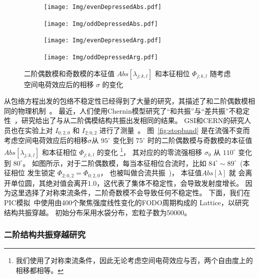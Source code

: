 \begin{figure}
    \centering
    \begin{subfigure}[b]{0.48\textwidth}
        \texttt{[image: Img/evenDepressedAbs.pdf]}
        \caption{}
        \label{sfig:stopbandEvenAbs}
    \end{subfigure}
    \begin{subfigure}[b]{0.48\textwidth}
        \texttt{[image: Img/oddDepressedAbs.pdf]}
        \caption{}
        \label{sfig:stopbandOddAbs}
    \end{subfigure}

    \begin{subfigure}[b]{0.48\textwidth}
        \texttt{[image: Img/evenDepressedArg.pdf]}
        \caption{}
        \label{sfig:stopbandEvenArg}
    \end{subfigure}
    \begin{subfigure}[b]{0.48\textwidth}
        \texttt{[image: Img/oddDepressedArg.pdf]}
        \caption{}
        \label{sfig:stopbandOddArg}
    \end{subfigure}
    \caption{二阶偶数模和奇数模的本征值 $Abs[\lambda_{j;k,l}]$ 和本征相位 $\Phi_{j;k,l}$ 随考虑空间电荷效应后的相移 $\sigma$ 的变化}
    \label{fig:stopband}
\end{figure}

从包络方程出发的包络不稳定性已经得到了大量的研究，其描述了和二阶偶数模相同的物理机制~\cite{11,li2018structure,18}。
最近，人们使用Chernin模型研究了“和共振”与“差共振”不稳定性~\cite{21,22}，研究给出了与从二阶偶模结构共振出发相同的结果。
GSI和CERN的研究人员也在实验上对 $I_{0;2,0}$ 和 $I_{2;0,2}$ 进行了测量~\cite{singh2014observations,cernAdrian}。
图~\eqref{fig:stopband} 是在流强不变而考虑空间电荷效应后的相移$\sigma$从 $95^{\circ}$
变化到 $75^{\circ}$ 时的二阶偶数模与奇数模的本征值 $Abs[\lambda_{j;k,l}]$ 和本征相位 $\Phi_{j;k,l}$ 的变化
\footnote{我们使用了对称束流条件，因此无论考虑空间电荷效应与否，两个自由度上的相移都相等。}，
其对应的的零流强相移 $\sigma_0$ 从 $110^{\circ}$ 变化到 $80^{\circ}$。
如图所示，对于二阶偶数模，每当本征相位合流时，比如 $84^\circ \sim 89^\circ$~(本征相位
发生锁定 $\Phi_{2;0,2}=\Phi_{0;2,0}$， 也被叫做合流共振~\cite{li2018structure})， 本征值$Abs[\lambda]$ 就
会离开单位圆，其绝对值会离开$1.0$，这代表了集体不稳定性，会导致发射度增长。
因为这里选择了对称束流条件，二阶奇数模不会导致任何不稳定性。
下面，我们在PIC模拟~\cite{23,24}中使用由400个聚焦强度线性变化的FODO周期构成的 Lattice，以研究结构共振穿越。
初始分布采用水袋分布，宏粒子数为50000。


\subsubsection{二阶结构共振穿越研究}

